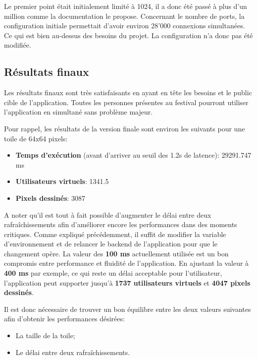 Le premier point était initialement limité à 1024, il a donc été passé à plus d'un million comme la documentation le propose. Concernant le nombre de ports, la configuration initiale permettait d'avoir environ 28'000 connexions simultanées. Ce qui est bien au-dessus des besoins du projet. La configuration n'a donc pas été modifiée.

\subsection{Résultats finaux}

Les résultats finaux sont très satisfaisants en ayant en tête les besoins et le public cible de l'application. Toutes les personnes présentes au festival pourront utiliser l'application en simultané sans problème majeur.

Pour rappel, les résultats de la version finale sont environ les suivants pour une toile de 64x64 pixels:

\begin{itemize}
  \item \textbf{Temps d'exécution} (avant d'arriver au seuil des 1.2s de latence): 29291.747 ms
  \item \textbf{Utilisateurs virtuels}: 1341.5
  \item \textbf{Pixels dessinés}: 3087
\end{itemize}

A noter qu'il est tout à fait possible d'augmenter le délai entre deux rafraîchissements afin d'améliorer encore les performances dans des moments critiques. Comme expliqué précédemment, il suffit de modifier la variable d'environnement et de relancer le backend de l'application pour que le changement opère. La valeur des \textbf{100 ms} actuellement utilisée est un bon compromis entre performance et fluidité de l'application. En ajustant la valeur à \textbf{400 ms} par exemple, ce qui reste un délai acceptable pour l'utilisateur, l'application peut supporter jusqu'à \textbf{1737 utilisateurs virtuels} et \textbf{4047 pixels dessinés}.

Il est donc nécessaire de trouver un bon équilibre entre les deux valeurs suivantes afin d'obtenir les performances désirées:

\begin{itemize}
  \item La taille de la toile;
  \item Le délai entre deux rafraîchissements.
\end{itemize}

